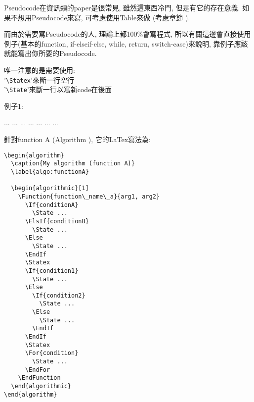 
Pseudocode在資訊類的paper是很常見, 雖然這東西冷門, 但是有它的存在意義.
如果不想用Pseudocode來寫, 可考慮使用Table來做 (考慮章節 ).

而由於需要寫Pseudocode的人, 理論上都100\%會寫程式, 所以有關這邊會直接使用例子(基本的function, if-elseif-else, while, return, switch-case)來說明, 靠例子應該就能寫出你所要的Pseudocode.

唯一注意的是需要使用:\\
'\verb|\Statex|'來斷一行空行\\
'\verb|\State|'來斷一行以寫新code在後面


\newpage
例子1:
\begin{algorithm}
  \caption{My algorithm (function A)}
  \label{algo:functionA}

  \begin{algorithmic}[1]
        \State ...
        \State ...
      \Else
        \State ...
      \EndIf
      \Statex
        \State ...
      \Else
          \State ...
        \Else
          \State ...
        \EndIf
      \EndIf
      \Statex
        \State ...
      \EndFor
    \EndFunction
  \end{algorithmic}
\end{algorithm}

\newpage
針對function A (Algorithm ), 它的LaTex寫法為:\\

\begin{DescriptionFrame}
  \begin{verbatim}
\begin{algorithm}
  \caption{My algorithm (function A)}
  \label{algo:functionA}

  \begin{algorithmic}[1]
    \Function{function\_name\_a}{arg1, arg2}
      \If{conditionA}
        \State ...
      \ElsIf{conditionB}
        \State ...
      \Else
        \State ...
      \EndIf
      \Statex
      \If{condition1}
        \State ...
      \Else
        \If{condition2}
          \State ...
        \Else
          \State ...
        \EndIf
      \EndIf
      \Statex
      \For{condition}
        \State ...
      \EndFor
    \EndFunction
  \end{algorithmic}
\end{algorithm}
  \end{verbatim}
\end{DescriptionFrame}

